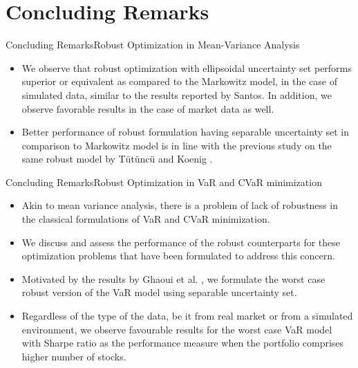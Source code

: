 \documentclass{beamer}
\begin{document}
\section{Concluding Remarks}

\begin{frame}{Concluding Remarks}{Robust Optimization in Mean-Variance Analysis}

\begin{itemize}
    \item {We observe that robust optimization with ellipsoidal uncertainty set performs superior or equivalent as compared to the Markowitz model, in the case of simulated data, similar to the results reported by Santos. In addition, we observe favorable results in the case of market data as well.  }
    \item {Better performance of robust formulation having separable uncertainty set in comparison to Markowitz model is in line with the previous study on the same robust model by T{\"u}t{\"u}nc{\"u} and Koenig \cite{tut}.}
\end{itemize}
    
\end{frame}

\begin{frame}{Concluding Remarks}{Robust Optimization in VaR and CVaR minimization}
\begin{itemize}
    \item Akin to mean variance analysis, there is a problem of lack of robustness in the classical formulations of VaR and CVaR minimization.
    \item We discuss and assess the performance of the robust counterparts for these optimization problems that have been formulated to address this concern.
    \item Motivated by the results by Ghaoui et al. \cite{ghaoui03}, we formulate the worst case robust version of the VaR model using separable uncertainty set.
    \item Regardless of the type of the data, be it from real market or from a simulated environment, we observe favourable results for the worst case VaR model with Sharpe ratio as the performance measure when the portfolio comprises higher number of stocks.
\end{itemize}
   
\end{frame}
\end{document}
